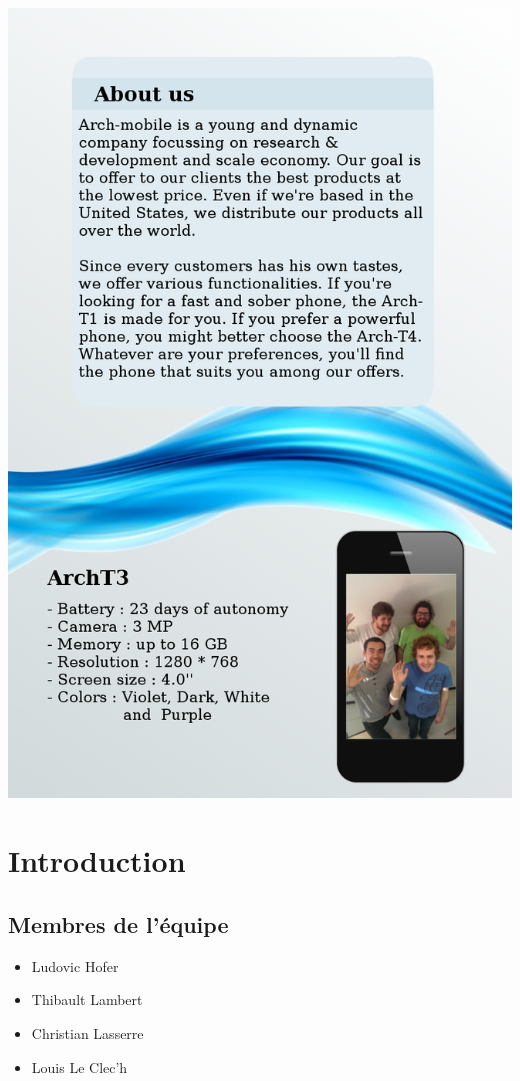 \documentclass[a4paper]{article}
\begin{document}
\begin{minipage}{.49\textwidth}
  \includegraphics[width=\linewidth]{flyerVerso}
\end{minipage}

\vskip 30mm

\pagebreak


\section{Introduction}
\subsection{Membres de l'équipe}
\begin{itemize}
\item Ludovic Hofer
\item Thibault Lambert
\item Christian Lasserre
\item Louis Le Clec'h
\end{itemize}
\end{document}

